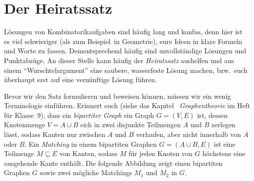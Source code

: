 \section{Der Heiratssatz}\label{kapitel:Heiratssatz}
Lösungen von Kombinatorikaufgaben sind häufig lang und konfus, denn hier ist es viel schwieriger (als zum Beispiel\ in Geometrie), eure Ideen in klare Formeln und Worte zu fassen. Dementsprechend häufig sind unvollständige Lösungen und Punktabzüge. An dieser Stelle kann häufig der \emph{Heiratssatz} aushelfen und aus einem \enquote{Wurschtelargument} eine saubere, wasserfeste Lösung machen, bzw.\ euch überhaupt erst auf eine vernünftige Lösung führen.

Bevor wir den Satz formulieren und beweisen können, müssen wir ein wenig Terminologie einführen. Erinnert euch (siehe das Kapitel ~\emph{Graphentheorie} im Heft für Klasse~9), dass ein \emph{bipartiter Graph} ein Graph $G=(V,E)$ ist, dessen Knotenmenge $V=A\cup B$ sich in zwei disjunkte Teilmengen $A$ und $B$ zerlegen lässt, sodass Kanten nur zwischen $A$ und $B$ verlaufen, aber nicht innerhalb von $A$ oder $B$. Ein \emph{Matching} in einem bipartiten Graphen $G=(A\cup B, E)$ ist eine Teilmenge $M\subseteq E$ von Kanten, sodass $M$ für jeden Knoten von $G$ höchstens eine ausgehende Kante enthält. Die folgende Abbildung zeigt einen bipartiten Graphen $G$ sowie zwei mögliche Matchings $M_1$ und $M_2$ in $G$.

